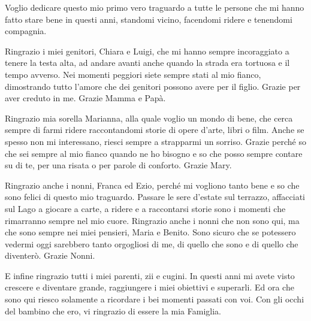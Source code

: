\newenvironment{dedication}
    {
    \clearpage %
    \thispagestyle{empty} %
    \vspace*{\stretch{1}} %
    \begin{center}\begin{em}}
    {\end{em}\end{center}
    \vspace*{\stretch{2}} %
    \clearpage %
    }


\begin{dedication}


  Voglio dedicare questo mio primo vero traguardo a tutte le persone che mi hanno fatto stare bene in questi anni, standomi vicino, facendomi ridere e tenendomi compagnia. 

  \vspace{1.5cm}

  Ringrazio i miei genitori, Chiara e Luigi, che mi hanno sempre incoraggiato a tenere la testa alta, ad andare avanti anche quando la strada era tortuosa e il tempo avverso. Nei momenti peggiori siete sempre stati al mio fianco, dimostrando tutto l'amore che dei genitori possono avere per il figlio. Grazie per aver creduto in me. Grazie Mamma e Papà.

  Ringrazio mia sorella Marianna, alla quale voglio un mondo di bene, che cerca sempre di farmi ridere raccontandomi storie di opere d'arte, libri o film. Anche se spesso non mi interessano, riesci sempre a strapparmi un sorriso. Grazie perché so che sei sempre al mio fianco quando ne ho bisogno e so che posso sempre contare su di te, per una risata o per parole di conforto. Grazie Mary.

  Ringrazio anche i nonni, Franca ed Ezio, perché mi vogliono tanto bene e so che sono felici di questo mio traguardo. Passare le sere d'estate sul terrazzo, affacciati sul Lago a giocare a carte, a ridere e a raccontarsi storie sono i momenti che rimarranno sempre nel mio cuore. Ringrazio anche i nonni che non sono qui, ma che sono sempre nei miei pensieri, Maria e Benito. Sono sicuro che se potessero vedermi oggi sarebbero tanto orgogliosi di me, di quello che sono e di quello che diventerò. Grazie Nonni.

  E infine ringrazio tutti i miei parenti, zii e cugini. In questi anni mi avete visto crescere e diventare grande, raggiungere i miei obiettivi e superarli. Ed ora che sono qui riesco solamente a ricordare i bei momenti passati con voi. Con gli occhi del bambino che ero, vi ringrazio di essere la mia Famiglia.


\end{dedication}
